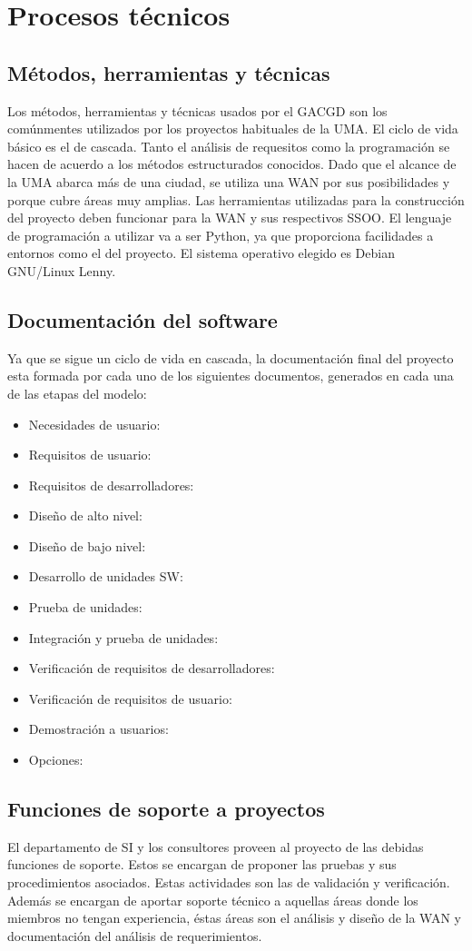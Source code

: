 \documentclass[11pt,a4paper,spanish,twoside]{report}
\begin{document}
\chapter{Procesos técnicos}
\section{Métodos, herramientas y técnicas}
Los métodos, herramientas y técnicas usados por el GACGD son los comúnmentes 
utilizados por los proyectos habituales de la UMA. El ciclo de vida básico es 
el de cascada. Tanto el análisis de requesitos como la programación se hacen 
de acuerdo a los métodos estructurados conocidos. Dado que el alcance de la 
UMA abarca más de una ciudad, se utiliza una WAN por sus posibilidades y 
porque cubre áreas muy amplias. Las herramientas utilizadas para la 
construcción del proyecto deben funcionar para la WAN y sus respectivos SSOO. 
El lenguaje de programación a utilizar va a ser Python, ya que proporciona 
facilidades a entornos como el del proyecto. El sistema operativo elegido es 
Debian GNU/Linux Lenny.

\section{Documentación del software}
Ya que se sigue un ciclo de vida en cascada, la documentación final del 
proyecto esta formada por cada uno de los siguientes documentos, generados en 
cada una de las etapas del modelo:

\begin{itemize}
\item Necesidades de usuario:
\item Requisitos de usuario:
\item Requisitos de desarrolladores:
\item Diseño de alto nivel:
\item Diseño de bajo nivel:
\item Desarrollo de unidades SW:
\item Prueba de unidades:
\item Integración y prueba de unidades:
\item Verificación de requisitos de desarrolladores:
\item Verificación de requisitos de usuario:
\item Demostración a usuarios:
\item Opciones:
\end{itemize}

\section{Funciones de soporte a proyectos}
El departamento de SI y los consultores proveen al proyecto de las debidas 
funciones de soporte. Estos se encargan de proponer las pruebas y sus 
procedimientos asociados. Estas actividades son las de validación y 
verificación. Además se encargan de aportar soporte técnico a aquellas áreas 
donde los miembros no tengan experiencia, éstas áreas son el análisis y diseño 
de la WAN y documentación del análisis de requerimientos.
\end{document}

